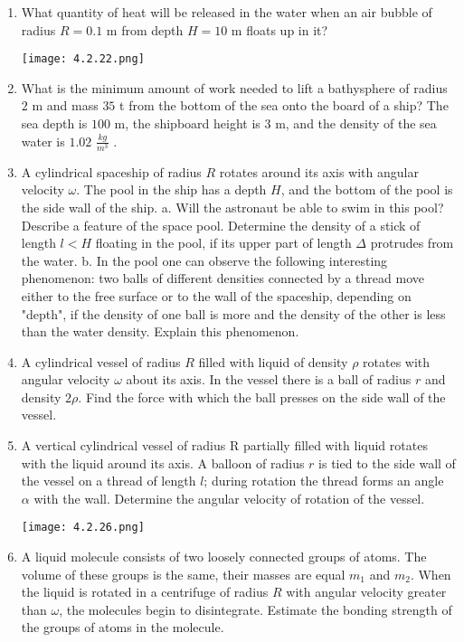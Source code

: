 \documentclass{article}
\begin{document}
\begin{enumerate}[label=4.2.\arabic*]
\item What quantity of heat will be released in the water when an air bubble of radius $R = 0.1$ m from depth $H = 10$ m floats up in it?
\begin{center}
    \texttt{[image: 4.2.22.png]}
\end{center}


\item What is the minimum amount of work needed to lift a bathysphere of radius $2$ m and mass $35$ t from the bottom of the sea onto the board of a ship? The sea depth is $100$ m, the shipboard height is $3$ m, and the density of the sea water is $1.02$ $\frac{kg}{m^3}$ .

\item A cylindrical spaceship of radius $R$ rotates around its axis with angular velocity $\omega$. The pool in the ship has a depth $H$, and the bottom of the pool is the side wall of the ship. 
a. Will the astronaut be able to swim in this pool? Describe a feature of the space pool. Determine the density of a stick of length $l < H$ floating in the pool, if its upper part of length $\Delta$ protrudes from the water. 
b. In the pool one can observe the following interesting phenomenon: two balls of different densities connected by a thread move either to the free surface or to the wall of the spaceship, depending on "depth", if the density of one ball is more and the density of the other is less than the water density. Explain this phenomenon.

\item A cylindrical vessel of radius $R$ filled with liquid of density $\rho$ rotates with angular velocity $\omega$ about its axis. In the vessel there is a ball of radius $r$ and density $2 \rho$. Find the force with which the ball presses on the side wall of the vessel.

\item A vertical cylindrical vessel of radius R partially filled with liquid rotates with the liquid around its axis. A balloon of radius $r$ is tied to the side wall of the vessel on a thread of length $l$; during rotation the thread forms an angle $\alpha$ with the wall. Determine the angular velocity of rotation of the vessel.
\begin{center}
    \texttt{[image: 4.2.26.png]}
\end{center}


\item A liquid molecule consists of two loosely connected groups of atoms. The volume of these groups is the same, their masses are equal $m_1$ and $m_2$. When the liquid is rotated in a centrifuge of radius $R$ with angular velocity greater than $\omega$, the molecules begin to disintegrate. Estimate the bonding strength of the groups of atoms in the molecule.


\end{enumerate}
\end{document}
